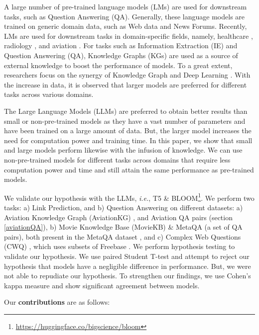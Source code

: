 \documentclass[11pt]{article}
\begin{document}
A large number of pre-trained language models (LMs) are used for downstream tasks, such as Question Answering (QA). Generally, these language models are trained on generic domain data, such as Web data and News Forums. 
Recently, LMs are used for downstream tasks in domain-specific fields, namely, healthcare  \cite{michalopoulos-etal-2021-umlsbert}, radiology \cite{kaveriradiology}, and aviation \cite{agarwal2022knowledge}.
For tasks such as Information Extraction (IE) and Question Answering (QA), Knowledge Graphs (KGs) are used as a source of external knowledge to boost the performance of models.
To a great extent, researchers focus on the synergy of Knowledge Graph and Deep Learning \cite{kvmNet,embedkgqa,saxena2022sequence}.
With the increase in data, it is observed that larger models are preferred for different tasks across various domains. 
\par
The Large Language Models (LLMs) are preferred to obtain better results than small or non-pre-trained models as they have a vast number of parameters and have been trained on a large amount of data.
But, the larger model increases the need for computation power and training time. In this paper, we show that small and large models perform likewise with the infusion of knowledge. We can use non-pre-trained models for different tasks across domains that require less computation power and time and still attain the same performance as pre-trained models.  
\par
We validate our hypothesis with the LLMs, \textit{i.e.}, T5 \cite{raffel2020exploring} \& BLOOM\footnote{\url{https://huggingface.co/bigscience/bloom}}. We perform two tasks: a) Link Prediction, and b) Question Answering on different datasets: a) Aviation Knowledge Graph (AviationKG) \cite{agarwal2022knowledge}, and Aviation QA pairs (section \ref{aviationQA}), b) Movie Knowledge Base (MovieKB) \& MetaQA (a set of QA pairs), both present in the MetaQA dataset \cite{zhang2018variational},
and c) Complex Web Questions (CWQ) \cite{talmor2018web}, which uses subsets of Freebase \cite{chah2017freebase}. We perform hypothesis testing to validate our hypothesis. We use paired Student T-test and attempt to reject our hypothesis that models have a negligible difference in performance. But, we were not able to repudiate our hypothesis. To strengthen our findings, we use Cohen's kappa measure and show significant agreement between models.  
\par
Our \textbf{contributions} are as follows:
\end{document}
